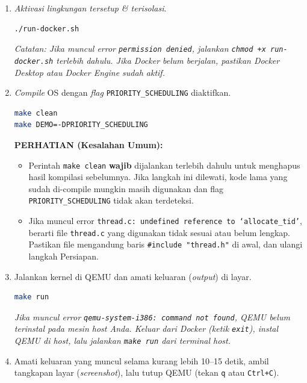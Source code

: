 \begin{enumerate}
	\item \textit{Aktivasi lingkungan tersetup \& terisolasi}.
	      \begin{lstlisting}[language=bash, caption={Menjalankan Docker menggunakan script}]
./run-docker.sh
    \end{lstlisting}

	      \textit{Catatan: Jika muncul error \texttt{permission denied}, jalankan \texttt{chmod +x run-docker.sh} terlebih dahulu. Jika Docker belum berjalan, pastikan Docker Desktop atau Docker Engine sudah aktif.}

	\item \textit{Compile} OS dengan \textit{flag} \texttt{PRIORITY\_SCHEDULING} diaktifkan.
	      \begin{lstlisting}[language=bash, caption={Compile dengan flag PRIORITY\_SCHEDULING}]
make clean
make DEMO=-DPRIORITY_SCHEDULING
    \end{lstlisting}

	      \textbf{PERHATIAN (Kesalahan Umum):}
	      \begin{itemize}
	      	\item Perintah \texttt{make clean} \textbf{wajib} dijalankan terlebih dahulu untuk menghapus hasil kompilasi sebelumnya. Jika langkah ini dilewati, kode lama yang sudah di-compile mungkin masih digunakan dan flag \texttt{PRIORITY\_SCHEDULING} tidak akan terdeteksi.
	      	\item Jika muncul error \texttt{thread.c: undefined reference to `allocate\_tid'}, berarti file \texttt{thread.c} yang digunakan tidak sesuai atau belum lengkap. Pastikan file mengandung baris \texttt{\#include "thread.h"} di awal, dan ulangi langkah Persiapan.
	      \end{itemize}

	\item Jalankan kernel di QEMU dan amati keluaran (\textit{output}) di layar.
	      \begin{lstlisting}[language=bash, caption={Menjalankan kernel di QEMU}]
make run
    \end{lstlisting}

	      \textit{Jika muncul error \texttt{qemu-system-i386: command not found}, QEMU belum terinstal pada mesin host Anda. Keluar dari Docker (ketik \texttt{exit}), instal QEMU di host, lalu jalankan \texttt{make run} dari terminal host.}

	\item Amati keluaran yang muncul selama kurang lebih 10--15 detik, ambil tangkapan layar (\textit{screenshot}), lalu tutup QEMU (tekan \texttt{q} atau \texttt{Ctrl+C}).


\end{enumerate}
